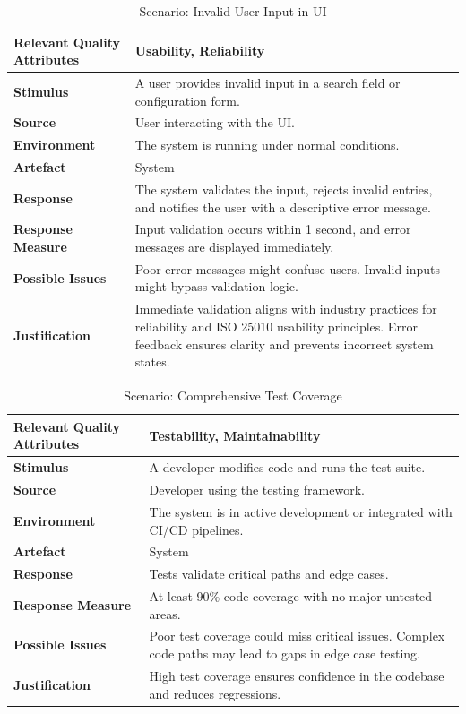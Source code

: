 \documentclass[10pt , a4paper]{report}
\begin{document}
\begin{small}
\begin{table}[h!tbp]
\centering
\renewcommand{\arraystretch}{1.3} %
\begin{tabular}{|l|p{9cm}|}
\hline
\textbf{Relevant Quality Attributes} & Usability, Reliability \\ \hline
\textbf{Stimulus} & A user provides invalid input in a search field or configuration form. \\ \hline
\textbf{Source} & User interacting with the UI. \\ \hline
\textbf{Environment} & The system is running under normal conditions. \\ \hline
\textbf{Artefact} & System \\ \hline
\textbf{Response} & The system validates the input, rejects invalid entries, and notifies the user with a descriptive error message. \\ \hline
\textbf{Response Measure} & Input validation occurs within 1 second, and error messages are displayed immediately. \\ \hline
\textbf{Possible Issues} & Poor error messages might confuse users. Invalid inputs might bypass validation logic. \\ \hline
\textbf{Justification} & Immediate validation aligns with industry practices for reliability and ISO 25010 usability principles. Error feedback ensures clarity and prevents incorrect system states. \\ \hline
\end{tabular}
\caption{Scenario: Invalid User Input in UI}
\end{table}


\begin{table}[h!tbp]
\centering
\renewcommand{\arraystretch}{1.3} %
\begin{tabular}{|l|p{9cm}|}
\hline
\textbf{Relevant Quality Attributes} & Testability, Maintainability \\ \hline
\textbf{Stimulus} & A developer modifies code and runs the test suite. \\ \hline
\textbf{Source} & Developer using the testing framework. \\ \hline
\textbf{Environment} & The system is in active development or integrated with CI/CD pipelines. \\ \hline
\textbf{Artefact} & System \\ \hline
\textbf{Response} & Tests validate critical paths and edge cases. \\ \hline
\textbf{Response Measure} & At least 90\% code coverage with no major untested areas. \\ \hline
\textbf{Possible Issues} & Poor test coverage could miss critical issues. Complex code paths may lead to gaps in edge case testing. \\ \hline
\textbf{Justification} & High test coverage ensures confidence in the codebase and reduces regressions. \\ \hline
\end{tabular}
\caption{Scenario: Comprehensive Test Coverage}
\end{table}

\end{small}
\end{document}
